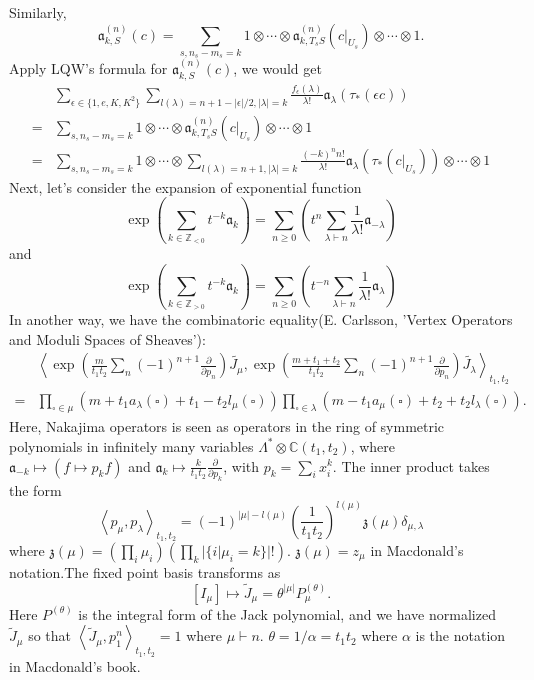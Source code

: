 \documentclass{article}
\renewcommand{\frak}[1]{\mathfrak{#1}}
\begin{document}
Similarly, $$\mathfrak{a}_{k,S}^{(n)}(c)=\sum_{s,n_s-m_s=k}1\otimes\cdots\otimes \mathfrak{a}_{k,T_sS}^{(n)}(c|_{U_s})\otimes\cdots\otimes1.$$
Apply LQW's formula for $\mathfrak{a}_{k,S}^{(n)}(c)$, we would get 
\[
\begin{aligned}
&\sum_{\epsilon\in\{1,e,K,K^2\}} \sum_{\mathit{l}(\lambda)=n+1-|\epsilon|/2,|\lambda|=k} \frac{f_\epsilon(\lambda)} {\lambda!} \mathfrak{a}_\lambda(\tau_*(\epsilon c))\\
=&\sum_{s,n_s-m_s=k}1\otimes\cdots\otimes \mathfrak{a}_{k,T_sS}^{(n)}(c|_{U_s})\otimes\cdots\otimes1\\
=&\sum_{s,n_s-m_s=k}1\otimes\cdots\otimes \sum_{\mathit{l}(\lambda)=n+1,|\lambda|=k} \frac{(-k)^nn!} {\lambda!} \mathfrak{a}_\lambda(\tau_*(c|_{U_s}))\otimes\cdots\otimes1
\end{aligned}
\]
Next, let's consider the expansion of exponential function
\[
\exp\left(\sum_{k\in \mathbb{Z}_{<0}}t^{-k}\mathfrak{a}_k\right)=\sum_{n\geqslant0}\left(t^n\sum_{\lambda\vdash n}\frac{1}{\lambda!}\mathfrak{a}_{-\lambda}\right)
\]
and
\[
\exp\left(\sum_{k\in \mathbb{Z}_{>0}}t^{-k}\mathfrak{a}_k\right)=\sum_{n\geqslant0}\left(t^{-n}\sum_{\lambda\vdash n}\frac{1}{\lambda!}\mathfrak{a}_{\lambda}\right)
\]
In another way, we have the combinatoric equality(E. Carlsson, 'Vertex Operators and Moduli Spaces of Sheaves'):
\[
\begin{aligned}
&\left<\exp\left(\frac{m}{t_1t_2}\sum_n(-1)^{n+1}\frac{\partial}{\partial p_n}\right)\tilde{J_\mu},\exp\left(\frac{m+t_1+t_2}{t_1t_2}\sum_n(-1)^{n+1}\frac{\partial}{\partial p_n}\right)\tilde{J_\lambda}\right>_{t_1,t_2}\\
=&\prod_{\square\in\mu}\left(m+t_1a_\lambda(\square)+t_1-t_2l_\mu(\square)\right)\prod_{\square\in\lambda}\left(m-t_1a_\mu(\square)+t_2+t_2l_\lambda(\square)\right).
\end{aligned}
\]
Here, Nakajima operators is seen as operators in the ring of symmetric polynomials in infinitely many variables $\Lambda^*\otimes\mathbb{C}(t_1,t_2)$, where $\mathfrak{a}_{-k}\mapsto(f\mapsto p_kf)$ and $\mathfrak{a}_k\mapsto\frac{k}{t_1t_2}\frac{\partial}{\partial p_k}$, with $p_k = \sum_i x_i^k$.
The inner product takes the form
\[\left<p_\mu,p_\lambda\right>_{t_1,t_2}=(-1)^{|\mu|-l(\mu)}\left(\frac{1}{t_1t_2}\right)^{l(\mu)}\mathfrak{z}(\mu)\delta_{\mu,\lambda}\]where $\mathfrak{z}(\mu)=(\prod_i\mu_i)(\prod_k|\{i|\mu_i=k\}|!)$. $\frak{z}(\mu)=z_\mu$ in Macdonald's notation.The fixed point basis transforms as 
\[
[I_\mu]\mapsto \tilde{J}_\mu = \theta^{|\mu|}P_{\mu}^{(\theta)}.
\]
Here $P^{(\theta)}$ is the integral form of the Jack polynomial, and we have normalized $\tilde{J}_\mu$ so that $\left<\tilde{J}_\mu, p_1^n\right>_{t_1,t_2} = 1$ where $\mu\vdash n$. 
$\theta=1/\alpha=t_1t_2$ where $\alpha$ is the notation in Macdonald's book.
\end{document}
